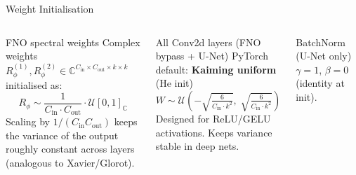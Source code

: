 \documentclass[aspectratio=169, 11pt]{beamer}
\begin{document}
\begin{frame}{Weight Initialisation}
  \begin{columns}[t]
      \begin{block}{FNO spectral weights}
        Complex weights $R_\phi^{(1)}, R_\phi^{(2)} \in
        \mathbb{C}^{C_\text{in}\times C_\text{out}\times k\times k}$
        initialised as:
        \[
          R_\phi \sim \frac{1}{C_\text{in}\cdot C_\text{out}}
                      \cdot \mathcal{U}[0,1]_\mathbb{C}
        \]
        Scaling by $1/(C_\text{in}C_\text{out})$ keeps the variance of the output
        roughly constant across layers (analogous to Xavier/Glorot).
      \end{block}
      \begin{block}{All Conv2d layers (FNO bypass + U-Net)}
        PyTorch default: \textbf{Kaiming uniform} (He init)
        \[
          W \sim \mathcal{U}\!\left(-\sqrt{\tfrac{6}{C_\text{in}\cdot k^2}},\;
                               \sqrt{\tfrac{6}{C_\text{in}\cdot k^2}}\right)
        \]
        Designed for ReLU/GELU activations. Keeps variance stable in deep nets.
      \end{block}
      \vspace{0.3em}
      \begin{block}{BatchNorm (U-Net only)}
        $\gamma=1$, $\beta=0$ (identity at init).
      \end{block}
  \end{columns}
\end{frame}
\end{document}
